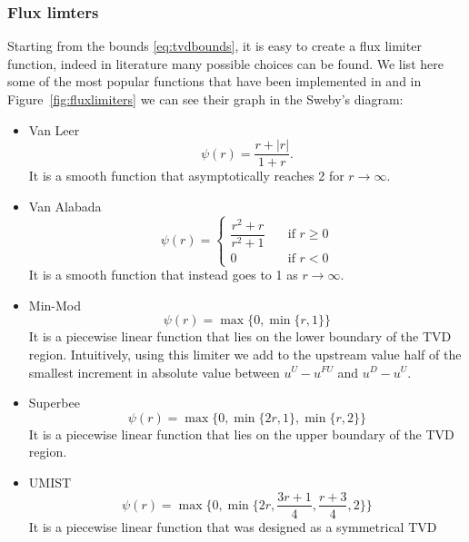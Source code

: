 \subsubsection{Flux limters}
Starting from the bounds \eqref{eq:tvdbounds}, it is easy to create a 
flux limiter function, indeed in literature many possible choices can be 
found. 
We list here some of the most popular functions that have been implemented in 
\DUMUX and in Figure~\ref{fig:fluxlimiters} we can see their graph in the 
Sweby's diagram:
\begin{itemize}
	\item Van Leer \cite{tvd:vanleer}
	\begin{equation} \label{eq:vl}
	\psi(r) = \frac{r+|r|}{1+r}.
	\end{equation}
	It is a smooth function that asymptotically reaches 2 for $r \rightarrow 
	\infty$.
%
	\item Van Alabada \cite{tvd:vanalabada}
	\begin{equation} \label{eq:vanalabada}
	\psi(r)=
	\begin{cases}
	\dfrac{r^2+r}{r^2+1} \quad &\text{if $r\geq 0$}\\[2ex]
	0 \quad &\text{if $r<0$}
	\end{cases}
	\end{equation}
	It is a smooth function that instead goes to 1 as $r \rightarrow \infty$.
%
	\item Min-Mod \cite{tvd:roe}
	\begin{equation} \label{eq:minmod}
	\psi(r) = \max \{0, \min \{ r,1\} \}
	\end{equation}
	It is a piecewise linear function that lies on the lower boundary of the 
	TVD region. Intuitively, using this limiter we add to the upstream value  
	half of	the smallest increment in absolute value between $u^U-u^{FU}$ and 
	$u^D - u^U$.
%
	\item Superbee \cite{tvd:roe}
	\begin{equation} \label{eq:superbee}
	\psi(r)=\max \{0, \min \{ 2r, 1\}, \min \{ r, 2\} \}
	\end{equation}
	It is a piecewise linear function that lies on the upper boundary of the 
	TVD region.
%
	\item UMIST \cite{tvd:lien}
	\begin{equation} \label{eq:umist}
	\psi(r)=\max \bigg\{0, \min \bigg\{ 2r, \frac{3r+1}{4},\frac{r+3}{4}, 
	2\bigg\} \bigg\}
	\end{equation}
	It is a piecewise linear function that was designed as a symmetrical TVD 

\end{itemize}
